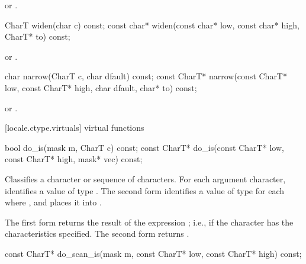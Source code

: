\begin{itemdescr}
\pnum
\returns
{} or .
\end{itemdescr}

%
\begin{itemdecl}
CharT       widen(char c) const;
const char* widen(const char* low, const char* high, CharT* to) const;
\end{itemdecl}

\begin{itemdescr}
\pnum
\returns
{} or .
\end{itemdescr}

%
\begin{itemdecl}
char         narrow(CharT c, char dfault) const;
const CharT* narrow(const CharT* low, const CharT* high, char dfault, char* to) const;
\end{itemdecl}

\begin{itemdescr}
\pnum
\returns
{} or .
\end{itemdescr}

[locale.ctype.virtuals]{ virtual functions}

%
\begin{itemdecl}
bool         do_is(mask m, CharT c) const;
const CharT* do_is(const CharT* low, const CharT* high, mask* vec) const;
\end{itemdecl}

\begin{itemdescr}
\pnum
\effects
Classifies a character or sequence of characters.
For each argument character,
identifies a value  of type .
The second form identifies a value  of type 
for each  where ,
and places it into .

\pnum
\returns
The first form returns the result of the expression ;
i.e.,  if the character has the characteristics specified.
The second form returns .
\end{itemdescr}

%
\begin{itemdecl}
const CharT* do_scan_is(mask m, const CharT* low, const CharT* high) const;
\end{itemdecl}

